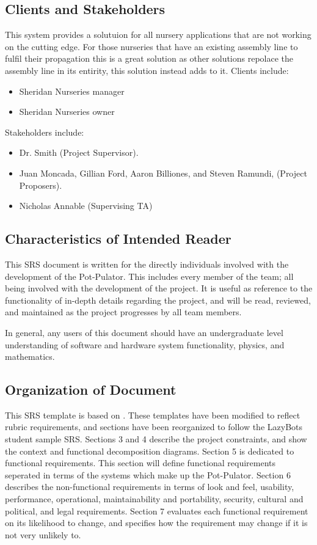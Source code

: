 \documentclass[12pt]{article}
\begin{document}
\subsection{Clients and Stakeholders}
\noindent This system provides a solutuion for all nursery applications that are not working on the cutting edge. For those nurseries that have an existing assembly line to fulfil their propagation this is a great solution as other solutions repolace the assembly line in its entirity, this solution instead adds to it.
\noindent Clients include:
\begin{itemize}
    \item Sheridan Nurseries manager
    \item Sheridan Nurseries owner
\end{itemize}
\noindent Stakeholders include:
\begin{itemize}
    \item Dr. Smith (Project Supervisor).
    \item Juan Moncada, Gillian Ford, Aaron Billiones, and Steven Ramundi, (Project Proposers).
    \item Nicholas Annable (Supervising TA)
    
\end{itemize}


\subsection{Characteristics of Intended Reader} \label{sec_IntendedReader}

This SRS document is written for the directly individuals involved with the development of the Pot-Pulator. This includes every member of the team; all being involved with the development of the project. It is useful as reference to the functionality of in-depth details regarding the project, and will be read, reviewed, and maintained as the project progresses by all team members. 

\noindent In general, any users of this document should have an undergraduate level understanding of software and hardware system functionality, physics, and mathematics. 

\subsection{Organization of Document}

This SRS template is based on \citet{SmithAndLai2005, SmithEtAl2007}. These templates have been modified to reflect rubric requirements, and sections have been reorganized to follow 
the LazyBots student sample SRS. Sections 3 and 4 describe the project constraints, and show the context and functional decomposition diagrams. 
Section 5 is dedicated to functional requirements. This section will define functional requirements seperated in terms of the systems which make up the Pot-Pulator. 
Section 6 describes the non-functional requirements in terms of look and feel, usability, performance, operational, maintainability and portability, security, cultural and political, 
and legal requirements. Section 7 evaluates each functional requirement on its likelihood to change, and specifies how the requirement may change if it is not very unlikely to.
\end{document}
